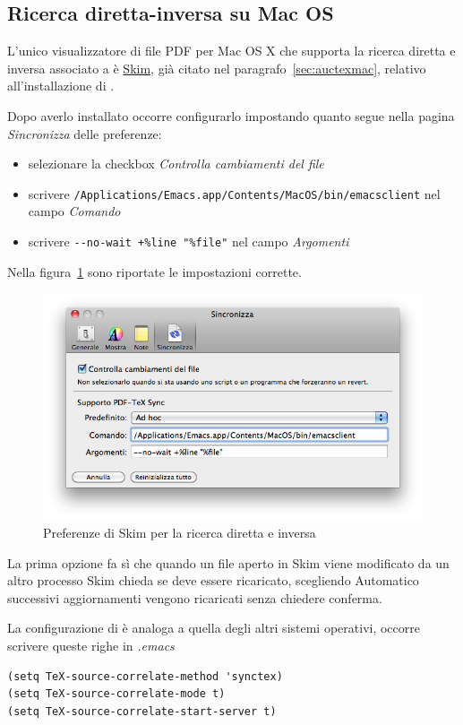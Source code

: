 \documentclass[10pt,a4paper]{article}
\begin{document}
\subsection*{Ricerca diretta-inversa su Mac OS}
\label{sec:fismac}

L'unico visualizzatore di file PDF per Mac OS X che supporta la
ricerca diretta e inversa associato a \emacs{} è
\href{http://skim-app.sourceforge.net/}{Skim}, già citato nel
paragrafo~\ref{sec:auctexmac}, relativo all'installazione di \auctex{}.

Dopo averlo installato occorre configurarlo impostando quanto segue
nella pagina \emph{Sincronizza} delle preferenze:
\begin{itemize}
\item selezionare la checkbox \emph{Controlla cambiamenti del file}
\item scrivere \verb!/Applications/Emacs.app/Contents/MacOS/bin/emacsclient!
  nel campo \emph{Comando}
\item scrivere \verb!--no-wait +%line "%file"! nel campo
  \emph{Argomenti}
\end{itemize}
Nella figura~\ref{fig:skimpref} sono riportate le impostazioni corrette.
\begin{figure}[tb]
  \centering
  \includegraphics[width=\textwidth]{preferenze-Skim}
  \caption{Preferenze di Skim per la ricerca diretta e inversa}
  \label{fig:skimpref}
\end{figure}

La prima opzione fa sì che quando un file aperto in Skim viene
modificato da un altro processo Skim chieda se deve essere ricaricato,
scegliendo Automatico successivi aggiornamenti vengono ricaricati
senza chiedere conferma.

La configurazione di \emacs{} è analoga a quella degli altri sistemi operativi,
occorre scrivere queste righe in \emph{.emacs}
\begin{verbatim}
(setq TeX-source-correlate-method 'synctex)
(setq TeX-source-correlate-mode t)
(setq TeX-source-correlate-start-server t)
\end{verbatim}
\end{document}
